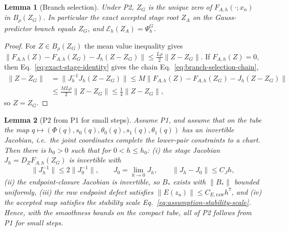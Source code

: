 \documentclass[preprint,12pt]{elsarticle}
\newtheorem{lemma}{Lemma}
\begin{document}
\begin{lemma}[Branch selection]
\label{lem:stage-residual-defect}
Under P2, $Z_G$ is the unique zero of $F_{A,h}(\cdot;x_n)$ in
$B_\rho(Z_G)$. In particular the exact accepted stage root $Z_A$ on the
Gauss-predictor branch equals $Z_G$, and $\mathcal E_h(Z_A)=\Psi_h^G$.
\end{lemma}

\begin{proof}
For $Z\in B_\rho(Z_G)$ the mean value inequality gives
$\|F_{A,h}(Z)-F_{A,h}(Z_G)-J_h(Z-Z_G)\|\le\tfrac{L\rho}{2}\|Z-Z_G\|$. If
$F_{A,h}(Z)=0$, then Eq.~\eqref{eq:exact-stage-identity} gives the chain
Eq.~\eqref{eq:branch-selection-chain},
\begin{equation}
\label{eq:branch-selection-chain}
\begin{aligned}
  \|Z-Z_G\|&=\|J_h^{-1}J_h(Z-Z_G)\|
  \le M\|F_{A,h}(Z)-F_{A,h}(Z_G)-J_h(Z-Z_G)\|\\
  &\le\tfrac{ML\rho}{2}\|Z-Z_G\|\le\tfrac14\|Z-Z_G\|,
\end{aligned}
\end{equation}
so $Z=Z_G$.
\end{proof}

\begin{lemma}[P2 from P1 for small steps]
\label{lem:p2-from-p1}
Assume P1, and assume that on the tube the map
$q\mapsto(\Phi(q),s_0(q),\theta_0(q),s_1(q),\theta_1(q))$ has an invertible
Jacobian, i.e.\ the joint coordinates complete the lower-pair constraints to
a chart. Then there is $h_0>0$ such that for $0<h\le h_0$: (i) the stage
Jacobian $J_h=D_ZF_{A,h}(Z_G)$ is invertible with
\begin{equation}
  \|J_h^{-1}\|\le 2\|J_0^{-1}\|,\qquad
  J_0=\lim_{h\to0}J_h,\qquad \|J_h-J_0\|\le C_Jh ,
  \label{eq:p2-perturbation-bound}
\end{equation}
(ii) the endpoint-closure Jacobian is invertible, so $B_\ast$ exists with
$\|B_\ast\|$ bounded uniformly, (iii) the raw endpoint defect satisfies
$\|E(z_u)\|\le C_{E,\mathrm{raw}}h^7$, and (iv) the accepted map satisfies the
stability scale Eq.~\eqref{eq:assumption-stability-scale}. Hence, with the
smoothness bounds on the compact tube, all of P2 follows from P1 for small
steps.
\end{lemma}
\end{document}

